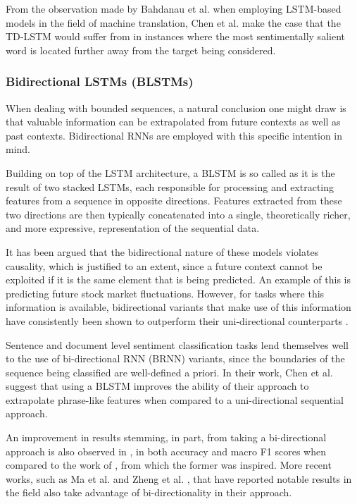 \documentclass[../../fyp.tex]{subfiles}
\begin{document}
From the observation made by Bahdanau et al. \cite{bahdanau2014} when employing LSTM-based models in the field of machine translation, Chen et al. \cite{chen2017} make the case that the TD-LSTM would suffer from in instances where the most sentimentally salient word is located further away from the target being considered.

\subsubsection{Bidirectional LSTMs (BLSTMs)}
When dealing with bounded sequences, a natural conclusion one  might draw is that valuable information can be extrapolated from future contexts as well as past contexts. Bidirectional RNNs are employed with this specific intention in mind.

Building on top of the LSTM architecture, a BLSTM is so called as it is the result of two stacked LSTMs, each responsible for processing and extracting features from a sequence in opposite directions. Features extracted from these two directions are then typically concatenated into a single, theoretically richer, and more expressive, representation of the sequential data.

It has been argued that the bidirectional nature of these models violates causality, which is justified to an extent, since a future context cannot be exploited if it is the same element that is being predicted. An example of this is predicting future stock market fluctuations. However, for tasks where this information is available, bidirectional variants that make use of this information have consistently been shown to outperform their uni-directional counterparts \cite{graves2012b}.

Sentence and document level sentiment classification tasks lend themselves well to the use of bi-directional RNN (BRNN) variants, since the boundaries of the sequence being classified are well-defined a priori. In their work, Chen et al. \cite{chen2017} suggest that using a BLSTM improves the ability of their approach to extrapolate phrase-like features when compared to a uni-directional sequential approach.

An improvement in results stemming, in part, from taking a bi-directional approach is also observed in \cite{zhang2016}, in both accuracy and macro F1 scores when compared to the work of \cite{vo2015}, from which the former was inspired. More recent works, such as Ma et al. \cite{ma2018} and Zheng et al. \cite{zheng2018}, that have reported notable results in the field also take advantage of bi-directionality in their approach.
\end{document}
